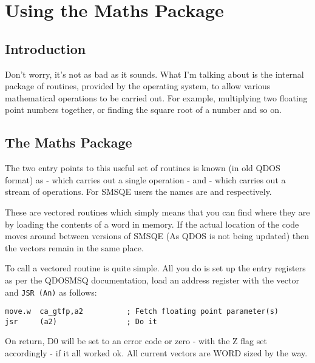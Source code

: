 \chapter{Using the Maths Package}

\section{Introduction}
\label{ch16-intro}%

Don't worry, it's not as bad as it sounds. What I'm talking about is
    the internal package of routines, provided by the operating system, to
    allow various mathematical operations to be carried out. For example,
    multiplying two floating point numbers together, or finding the square
    root of a number and so on.

\section{The Maths Package}
\label{ch16-the-package}%

The two entry points to this useful set of routines is known (in old
    QDOS format) as  -{} which carries out a single operation -{} and
     -{} which carries out a stream of operations. For SMSQE users the
    names are  and  respectively.

These are vectored routines which simply means that you can find
    where they are by loading the contents of a word in memory. If the actual
    location of the code moves around between versions of SMSQE (As QDOS is
    not being updated) then the vectors remain in the same place.

To call a vectored routine is quite simple. All you do is set up the
    entry registers as per the QDOSMSQ documentation, load an address register
    with the vector and \lstinline{JSR (An)} as follows:

\begin{lstlisting}[firstnumber=1,caption={Example Code, Calling a Vectored Routine}]
move.w  ca_gtfp,a2          ; Fetch floating point parameter(s)
jsr     (a2)                ; Do it
\end{lstlisting}

On return, D0 will be set to an error code or zero -{} with the Z flag
    set accordingly -{} if it all worked ok. All current vectors are WORD sized
    by the way.

